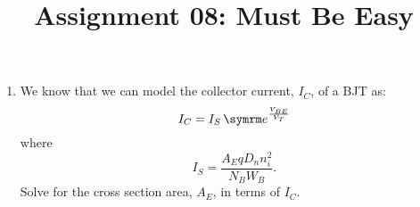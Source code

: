 \documentclass{article}
\title{Assignment 08: Must Be Easy}
\begin{document}
\renderTitle

\begin{enumerate}[leftmargin=*]
	\item
		We know that we can model the collector current,
		\(I_C\), of a BJT as:
		\begin{equation}
			I_C = I_S \, \e^{\frac{V_{BE}}{V_T}}
		\end{equation}
		where
		\begin{equation}
			I_S = \frac{A_E q D_n n_i^2}{N_B W_B}.
		\end{equation}
		Solve for the cross section area, \(A_E\), in terms of
		\(I_C\).
\end{enumerate}
\end{document}
